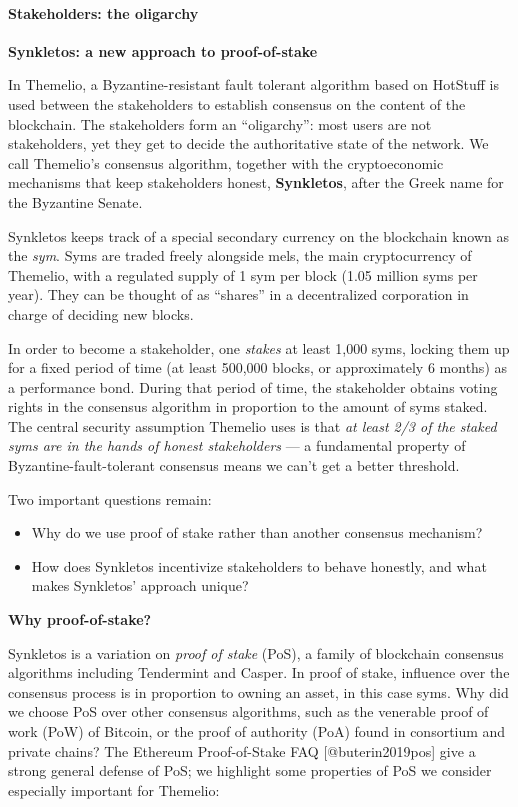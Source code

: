 \documentclass[]{article}
\providecommand{\tightlist}{%
  \setlength{\itemsep}{0pt}\setlength{\parskip}{0pt}}
\let\oldparagraph\paragraph
\renewcommand{\paragraph}[1]{\oldparagraph{#1}\mbox{}}
\begin{document}
\hypertarget{stakeholders-the-oligarchy}{%
\paragraph{Stakeholders: the
oligarchy}\label{stakeholders-the-oligarchy}}

\textbf{Synkletos: a new approach to proof-of-stake}

In Themelio, a Byzantine-resistant fault tolerant algorithm based on
HotStuff is used between the stakeholders to establish consensus on the
content of the blockchain. The stakeholders form an ``oligarchy'': most
users are not stakeholders, yet they get to decide the authoritative
state of the network. We call Themelio's consensus algorithm, together
with the cryptoeconomic mechanisms that keep stakeholders honest,
\textbf{Synkletos}, after the Greek name for the Byzantine Senate.

Synkletos keeps track of a special secondary currency on the blockchain
known as the \emph{sym}. Syms are traded freely alongside mels, the main
cryptocurrency of Themelio, with a regulated supply of 1 sym per block
(1.05 million syms per year). They can be thought of as ``shares'' in a
decentralized corporation in charge of deciding new blocks.

In order to become a stakeholder, one \emph{stakes} at least 1,000 syms,
locking them up for a fixed period of time (at least 500,000 blocks, or
approximately 6 months) as a performance bond. During that period of
time, the stakeholder obtains voting rights in the consensus algorithm
in proportion to the amount of syms staked. The central security
assumption Themelio uses is that \emph{at least 2/3 of the staked syms
are in the hands of honest stakeholders} --- a fundamental property of
Byzantine-fault-tolerant consensus means we can't get a better
threshold.

Two important questions remain:

\begin{itemize}
\tightlist
\item
  Why do we use proof of stake rather than another consensus mechanism?
\item
  How does Synkletos incentivize stakeholders to behave honestly, and
  what makes Synkletos' approach unique?
\end{itemize}

\textbf{Why proof-of-stake?}

Synkletos is a variation on \emph{proof of stake} (PoS), a family of
blockchain consensus algorithms including Tendermint and Casper. In
proof of stake, influence over the consensus process is in proportion to
owning an asset, in this case syms. Why did we choose PoS over other
consensus algorithms, such as the venerable proof of work (PoW) of
Bitcoin, or the proof of authority (PoA) found in consortium and private
chains? The Ethereum Proof-of-Stake FAQ {[}@buterin2019pos{]} give a
strong general defense of PoS; we highlight some properties of PoS we
consider especially important for Themelio:
\end{document}
